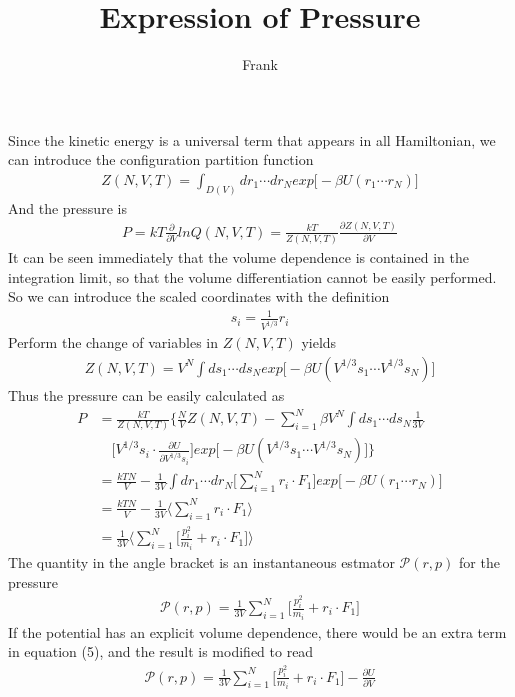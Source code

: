 \documentclass{article}
\title{Expression of Pressure }
\author{Frank}
\begin{document}
\maketitle
Since the kinetic energy is a universal term that appears in all Hamiltonian, we can introduce the configuration partition function
\begin{align}
Z(N,V,T)=\int_{D(V)}dr_1\cdots dr_Nexp\big[-\beta U(r_1\cdots r_N)\big]
\end{align}
And the pressure is
\begin{align}
P=kT\frac{\partial}{\partial V}lnQ(N,V,T)=\frac{kT}{Z(N,V,T)}\frac{\partial Z(N,V,T)}{\partial V}
\end{align}
It can be seen immediately that the volume dependence is contained in the integration limit, so that the volume differentiation cannot be easily performed. \\
So we can introduce the scaled coordinates with the definition 
\begin{align}
s_i=\frac{1}{V^{1/3}}r_i
\end{align}
Perform the change of variables in $Z(N,V,T)$ yields
\begin{align}
Z(N,V,T)=V^N\int ds_1\cdots ds_Nexp\big[-\beta U(V^{1/3}s_1\cdots V^{1/3}s_N)\big]
\end{align}
Thus the pressure can be easily calculated as
\begin{align}
P&=\frac{kT}{Z(N,V,T)}\bigg\{\frac{N}{V}Z(N,V,T)-\sum_{i=1}^N\beta V^N\int ds_1\cdots ds_N\frac{1}{3V}\nonumber\\
&\quad\bigg[V^{1/3}s_i\cdot\frac{\partial U}{\partial V^{1/3}s_i}\bigg]exp\big[-\beta U(V^{1/3}s_1\cdots V^{1/3}s_N)\big]\bigg\}\\
&=\frac{kTN}{V}-\frac{1}{3V}\int dr_1\cdots dr_N\bigg[\sum_{i=1}^{N}r_i\cdot F_1\bigg]exp\big[-\beta U(r_1\cdots r_N)\big]\nonumber\\
&=\frac{kTN}{V}-\frac{1}{3V}\bigg\langle\sum_{i=1}^{N}r_i\cdot F_1\bigg\rangle\\
&=\frac{1}{3V}\bigg\langle\sum_{i=1}^{N}\bigg[\frac{p_i^2}{m_i}+r_i\cdot F_1\bigg]\bigg\rangle
\end{align}
The quantity in the angle bracket is an instantaneous estmator $\mathcal{P}(r,p)$ for the pressure
\begin{align}
\mathcal{P}(r,p)=\frac{1}{3V}\sum_{i=1}^{N}\bigg[\frac{p_i^2}{m_i}+r_i\cdot F_1\bigg]
\end{align}
If the potential has an explicit volume dependence, there would be an extra term in equation (5), and the result is modified to read
\begin{align}
\mathcal{P}(r,p)=\frac{1}{3V}\sum_{i=1}^{N}\bigg[\frac{p_i^2}{m_i}+r_i\cdot F_1\bigg]-\frac{\partial U}{\partial V}
\end{align}
\end{document}
